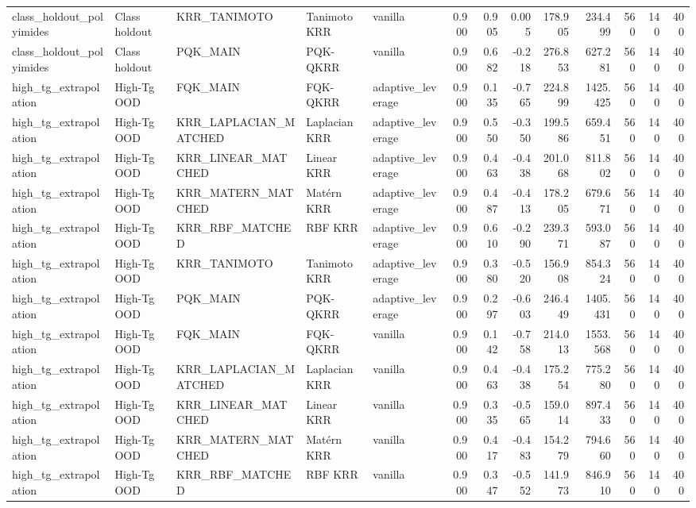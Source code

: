 \begin{tabular}{lllllrrrrrrrr}
class\_holdout\_polyimides & Class holdout & KRR\_TANIMOTO & Tanimoto KRR & vanilla & 0.900 & 0.905 & 0.005 & 178.905 & 234.499 & 560 & 140 & 400 \\
class\_holdout\_polyimides & Class holdout & PQK\_MAIN & PQK-QKRR & vanilla & 0.900 & 0.682 & -0.218 & 276.853 & 627.281 & 560 & 140 & 400 \\
high\_tg\_extrapolation & High-Tg OOD & FQK\_MAIN & FQK-QKRR & adaptive\_leverage & 0.900 & 0.135 & -0.765 & 224.899 & 1425.425 & 560 & 140 & 400 \\
high\_tg\_extrapolation & High-Tg OOD & KRR\_LAPLACIAN\_MATCHED & Laplacian KRR & adaptive\_leverage & 0.900 & 0.550 & -0.350 & 199.586 & 659.451 & 560 & 140 & 400 \\
high\_tg\_extrapolation & High-Tg OOD & KRR\_LINEAR\_MATCHED & Linear KRR & adaptive\_leverage & 0.900 & 0.463 & -0.438 & 201.068 & 811.802 & 560 & 140 & 400 \\
high\_tg\_extrapolation & High-Tg OOD & KRR\_MATERN\_MATCHED & Matérn KRR & adaptive\_leverage & 0.900 & 0.487 & -0.413 & 178.205 & 679.671 & 560 & 140 & 400 \\
high\_tg\_extrapolation & High-Tg OOD & KRR\_RBF\_MATCHED & RBF KRR & adaptive\_leverage & 0.900 & 0.610 & -0.290 & 239.371 & 593.087 & 560 & 140 & 400 \\
high\_tg\_extrapolation & High-Tg OOD & KRR\_TANIMOTO & Tanimoto KRR & adaptive\_leverage & 0.900 & 0.380 & -0.520 & 156.908 & 854.324 & 560 & 140 & 400 \\
high\_tg\_extrapolation & High-Tg OOD & PQK\_MAIN & PQK-QKRR & adaptive\_leverage & 0.900 & 0.297 & -0.603 & 246.449 & 1405.431 & 560 & 140 & 400 \\
high\_tg\_extrapolation & High-Tg OOD & FQK\_MAIN & FQK-QKRR & vanilla & 0.900 & 0.142 & -0.758 & 214.013 & 1553.568 & 560 & 140 & 400 \\
high\_tg\_extrapolation & High-Tg OOD & KRR\_LAPLACIAN\_MATCHED & Laplacian KRR & vanilla & 0.900 & 0.463 & -0.438 & 175.254 & 775.280 & 560 & 140 & 400 \\
high\_tg\_extrapolation & High-Tg OOD & KRR\_LINEAR\_MATCHED & Linear KRR & vanilla & 0.900 & 0.335 & -0.565 & 159.014 & 897.433 & 560 & 140 & 400 \\
high\_tg\_extrapolation & High-Tg OOD & KRR\_MATERN\_MATCHED & Matérn KRR & vanilla & 0.900 & 0.417 & -0.483 & 154.279 & 794.660 & 560 & 140 & 400 \\
high\_tg\_extrapolation & High-Tg OOD & KRR\_RBF\_MATCHED & RBF KRR & vanilla & 0.900 & 0.347 & -0.552 & 141.973 & 846.910 & 560 & 140 & 400 \\

\end{tabular}
